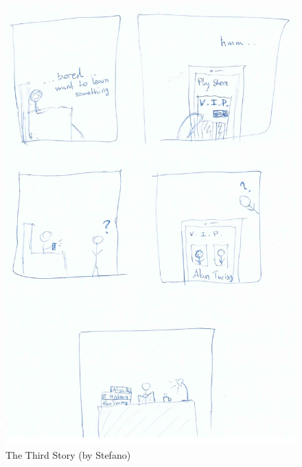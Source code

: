 \documentclass[12pt]{scrartcl}
\begin{document}
	\begin{figure}[H]
        		\centering
       		\includegraphics[width=\textwidth]{../images/story3.jpg}
       		\caption{The Third Story (by Stefano)}
        		\label{story3}
	\end{figure}
	
\end{document}
